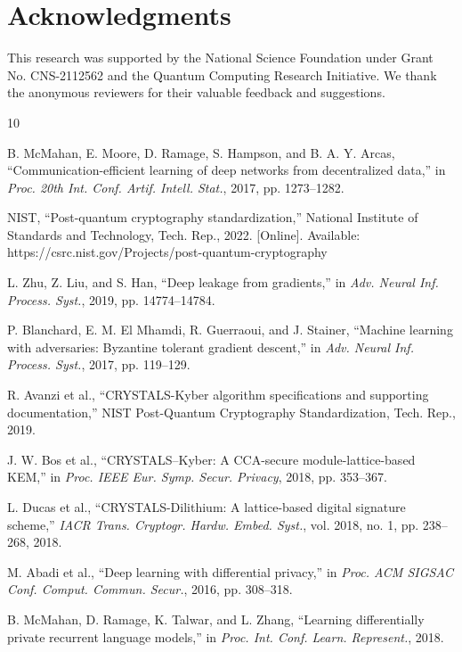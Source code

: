\documentclass[conference]{IEEEtran}
\begin{document}
\section*{Acknowledgments}

This research was supported by the National Science Foundation under Grant No. CNS-2112562 and the Quantum Computing Research Initiative. We thank the anonymous reviewers for their valuable feedback and suggestions.


\begin{thebibliography}{10}

B. McMahan, E. Moore, D. Ramage, S. Hampson, and B. A. Y. Arcas, ``Communication-efficient learning of deep networks from decentralized data,'' in \textit{Proc. 20th Int. Conf. Artif. Intell. Stat.}, 2017, pp. 1273--1282.

NIST, ``Post-quantum cryptography standardization,'' National Institute of Standards and Technology, Tech. Rep., 2022. [Online]. Available: https://csrc.nist.gov/Projects/post-quantum-cryptography

L. Zhu, Z. Liu, and S. Han, ``Deep leakage from gradients,'' in \textit{Adv. Neural Inf. Process. Syst.}, 2019, pp. 14774--14784.

P. Blanchard, E. M. El Mhamdi, R. Guerraoui, and J. Stainer, ``Machine learning with adversaries: Byzantine tolerant gradient descent,'' in \textit{Adv. Neural Inf. Process. Syst.}, 2017, pp. 119--129.

R. Avanzi et al., ``CRYSTALS-Kyber algorithm specifications and supporting documentation,'' NIST Post-Quantum Cryptography Standardization, Tech. Rep., 2019.

J. W. Bos et al., ``CRYSTALS--Kyber: A CCA-secure module-lattice-based KEM,'' in \textit{Proc. IEEE Eur. Symp. Secur. Privacy}, 2018, pp. 353--367.

L. Ducas et al., ``CRYSTALS-Dilithium: A lattice-based digital signature scheme,'' \textit{IACR Trans. Cryptogr. Hardw. Embed. Syst.}, vol. 2018, no. 1, pp. 238--268, 2018.

M. Abadi et al., ``Deep learning with differential privacy,'' in \textit{Proc. ACM SIGSAC Conf. Comput. Commun. Secur.}, 2016, pp. 308--318.

B. McMahan, D. Ramage, K. Talwar, and L. Zhang, ``Learning differentially private recurrent language models,'' in \textit{Proc. Int. Conf. Learn. Represent.}, 2018.


\end{thebibliography}
\end{document}
